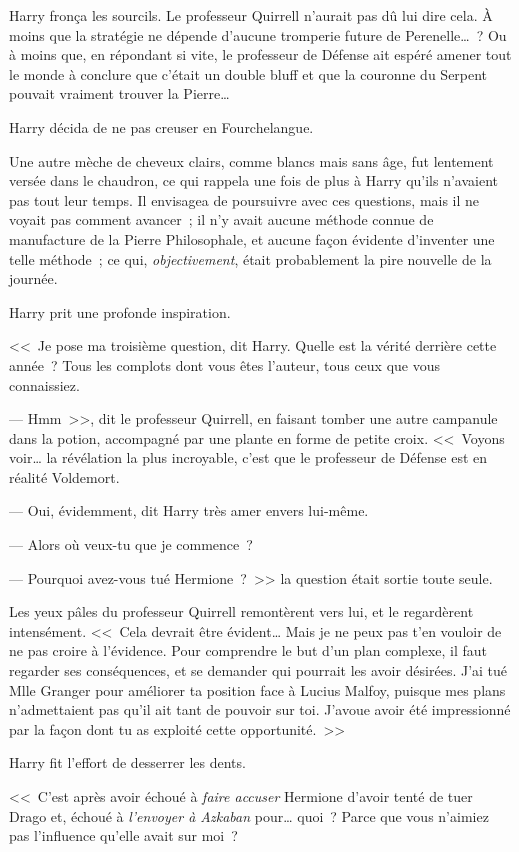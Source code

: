 Harry fronça les sourcils. Le professeur Quirrell n'aurait pas dû lui dire cela. À moins que la stratégie ne dépende d'aucune tromperie future de Perenelle…~? Ou à moins que, en répondant si vite, le professeur de Défense ait espéré amener tout le monde à conclure que c'était un double bluff et que la couronne du Serpent pouvait vraiment trouver la Pierre…

Harry décida de ne pas creuser en Fourchelangue.

Une autre mèche de cheveux clairs, comme blancs mais sans âge, fut lentement versée dans le chaudron, ce qui rappela une fois de plus à Harry qu'ils n'avaient pas tout leur temps. Il envisagea de poursuivre avec ces questions, mais il ne voyait pas comment avancer~; il n'y avait aucune méthode connue de manufacture de la Pierre Philosophale, et aucune façon évidente d'inventer une telle méthode~; ce qui, \emph{objectivement}, était probablement la pire nouvelle de la journée.

Harry prit une profonde inspiration.

<<~Je pose ma troisième question, dit Harry. Quelle est la vérité derrière cette année~? Tous les complots dont vous êtes l'auteur, tous ceux que vous connaissiez.

--- Hmm~>>, dit le professeur Quirrell, en faisant tomber une autre campanule dans la potion, accompagné par une plante en forme de petite croix. <<~Voyons voir… la révélation la plus incroyable, c'est que le professeur de Défense est en réalité Voldemort.

--- Oui, évidemment, dit Harry très amer envers lui-même.

--- Alors où veux-tu que je commence~?

--- Pourquoi avez-vous tué Hermione~?~>> la question était sortie toute seule.

Les yeux pâles du professeur Quirrell remontèrent vers lui, et le regardèrent intensément. <<~Cela devrait être évident… Mais je ne peux pas t'en vouloir de ne pas croire à l'évidence. Pour comprendre le but d'un plan complexe, il faut regarder ses conséquences, et se demander qui pourrait les avoir désirées. J'ai tué Mlle Granger pour améliorer ta position face à Lucius Malfoy, puisque mes plans n'admettaient pas qu'il ait tant de pouvoir sur toi. J'avoue avoir été impressionné par la façon dont tu as exploité cette opportunité.~>>

Harry fit l'effort de desserrer les dents.

<<~C'est après avoir échoué à \emph{faire accuser} Hermione d'avoir tenté de tuer Drago et, échoué à \emph{l'envoyer à Azkaban} pour… quoi~? Parce que vous n'aimiez pas l'influence qu'elle avait sur moi~?

